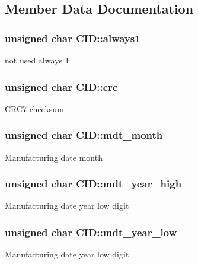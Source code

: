 \subsection{Member Data Documentation}
\subsubsection[{\texorpdfstring{always1}{always1}}]{\setlength{\rightskip}{0pt plus 5cm}unsigned char C\+I\+D\+::always1}\hypertarget{struct_c_i_d_ae9d4ba51ed4102255aa87bb92882f119}{}\label{struct_c_i_d_ae9d4ba51ed4102255aa87bb92882f119}
not used always 1 
\subsubsection[{\texorpdfstring{crc}{crc}}]{\setlength{\rightskip}{0pt plus 5cm}unsigned char C\+I\+D\+::crc}\hypertarget{struct_c_i_d_aa10cfc5aef8e979e47009474dfa3d940}{}\label{struct_c_i_d_aa10cfc5aef8e979e47009474dfa3d940}
C\+R\+C7 checksum 
\subsubsection[{\texorpdfstring{mdt\+\_\+month}{mdt_month}}]{\setlength{\rightskip}{0pt plus 5cm}unsigned char C\+I\+D\+::mdt\+\_\+month}\hypertarget{struct_c_i_d_a60e35d4b824da135dc2a9197c5544929}{}\label{struct_c_i_d_a60e35d4b824da135dc2a9197c5544929}
Manufacturing date month 
\subsubsection[{\texorpdfstring{mdt\+\_\+year\+\_\+high}{mdt_year_high}}]{\setlength{\rightskip}{0pt plus 5cm}unsigned char C\+I\+D\+::mdt\+\_\+year\+\_\+high}\hypertarget{struct_c_i_d_a6b16c5e74b48af39036aa831fca4cb46}{}\label{struct_c_i_d_a6b16c5e74b48af39036aa831fca4cb46}
Manufacturing date year low digit 
\subsubsection[{\texorpdfstring{mdt\+\_\+year\+\_\+low}{mdt_year_low}}]{\setlength{\rightskip}{0pt plus 5cm}unsigned char C\+I\+D\+::mdt\+\_\+year\+\_\+low}\hypertarget{struct_c_i_d_afe44a84b416bea68dea9bad27c172c3d}{}\label{struct_c_i_d_afe44a84b416bea68dea9bad27c172c3d}
Manufacturing date year low digit 
